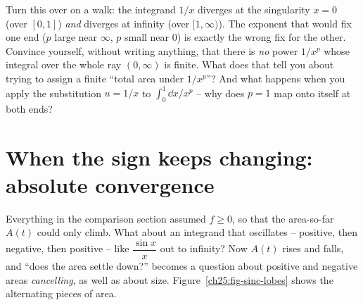 \begin{walkbox}
Turn this over on a walk: the integrand $1/x$ diverges at the singularity
$x=0$ (over $[0,1]$) \emph{and} diverges at infinity (over $[1,\infty)$). The
exponent that would fix one end ($p$ large near $\infty$, $p$ small near $0$) is
exactly the wrong fix for the other. Convince yourself, without writing anything,
that there is \emph{no} power $1/x^p$ whose integral over the whole ray
$(0,\infty)$ is finite. What does that tell you about trying to assign a finite
``total area under $1/x^p$''? And what happens when you apply the substitution
$u = 1/x$ to $\int_0^1 \dd x/x^p$ -- why does $p=1$ map onto itself at both ends?
\end{walkbox}

\section{When the sign keeps changing: absolute convergence}
\label{ch25:absolute}

Everything in the comparison section assumed $f \ge 0$, so that the area-so-far
$A(t)$ could only climb. What about an integrand that oscillates -- positive, then
negative, then positive -- like $\dfrac{\sin x}{x}$ out to infinity? Now $A(t)$
rises and falls, and ``does the area settle down?'' becomes a question about
positive and negative areas \emph{cancelling}, as well as about size.
Figure~\ref{ch25:fig-sinc-lobes} shows the alternating pieces of area.

